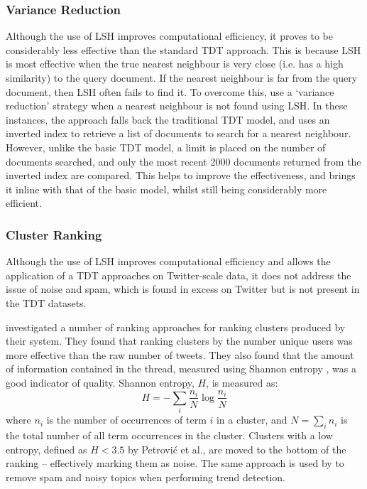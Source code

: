 \subsubsection{Variance Reduction}
Although the use of LSH improves computational efficiency, it proves to be considerably less effective than the standard TDT approach.
This is because LSH is most effective when the true nearest neighbour is very close (i.e. has a high similarity) to the query document.
If the nearest neighbour is far from the query document, then LSH often fails to find it.
To overcome this, \cite{Petrovic:2010:SFS:1857999.1858020} use a `variance reduction' strategy when a nearest neighbour is not found using LSH.
In these instances, the approach falls back the traditional TDT model, and uses an inverted index to retrieve a list of documents to search for a nearest neighbour.
However, unlike the basic TDT model, a limit is placed on the number of documents searched, and only the most recent 2000 documents returned from the inverted index are compared.
This helps to improve the effectiveness, and brings it inline with that of the basic model, whilst still being considerably more efficient.

\subsubsection{Cluster Ranking}
Although the use of LSH improves computational efficiency and allows the application of a TDT approaches on Twitter-scale data, it does not address the issue of noise and spam, which is found in excess on Twitter but is not present in the TDT datasets.

\cite{Petrovic:2010:SFS:1857999.1858020} investigated a number of ranking approaches for ranking clusters produced by their system.
They found that ranking clusters by the number unique users was more effective than the raw number of tweets.
They also found that the amount of information contained in the thread, measured using Shannon entropy \citep{Shannon:2001:MTC:584091.584093}, was a good indicator of quality.
Shannon entropy, $H$, is measured as:
\begin{displaymath}
	H = -\sum_i{\frac{n_i}{N} \log \frac{n_i}{N}}
\end{displaymath}
where $n_i$ is the number of occurrences of term $i$ in a cluster,	and $N = \sum_i{n_i}$ is the total number of all term occurrences in the cluster.
Clusters with a low entropy, defined as $H < 3.5$ by Petrović et al., are moved to the bottom of the ranking -- effectively marking them as noise.
The same approach is used by \cite{benhardus2013streaming} to remove spam and noisy topics when performing trend detection.

